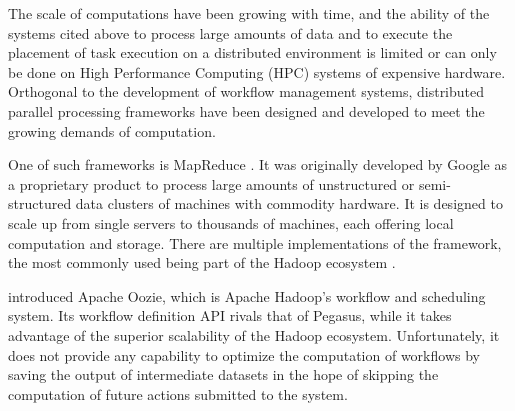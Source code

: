 The scale of computations have been growing with time, and the ability of the systems cited above to process large amounts of data and to execute the placement of task execution on a distributed environment is limited or can only be done on High Performance Computing (HPC) systems of expensive hardware.  Orthogonal to the development of workflow management systems, distributed parallel processing frameworks have been designed and developed to meet the growing demands of computation.  

One of such frameworks is MapReduce \citep{dean2008mapreduce}. It was originally developed by Google as a proprietary product to process large amounts of unstructured or semi-structured data clusters of machines with commodity hardware. It is designed to scale up from single servers to thousands of machines, each offering local computation and storage. There are multiple implementations of the framework, the most commonly used being part of the Hadoop ecosystem \citep{white2012hadoop}.

\cite{islam2012oozie} introduced Apache Oozie, which is Apache Hadoop's workflow and scheduling system.  Its workflow definition API rivals that of Pegasus, while it takes advantage of the superior scalability of the Hadoop ecosystem. Unfortunately, it does not provide any capability to optimize the computation of workflows by saving the output of intermediate datasets in the hope of skipping the computation of future actions submitted to the system.